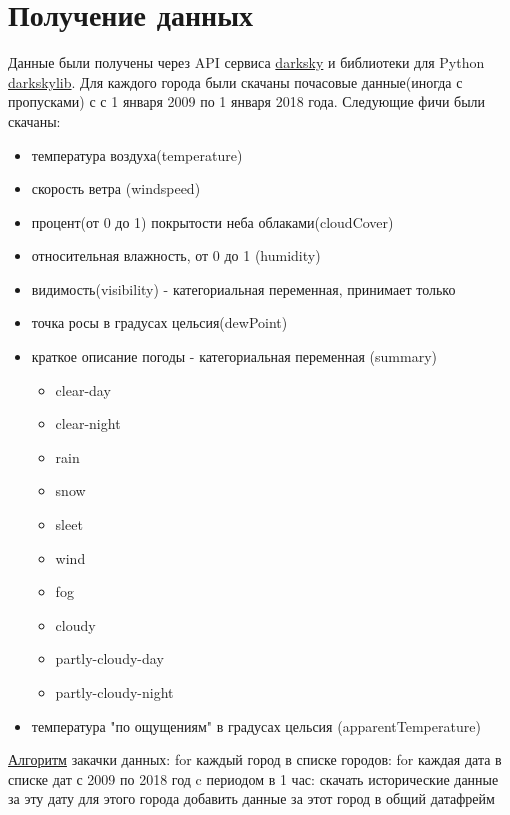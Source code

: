 \documentclass[11pt]{article}
\begin{document}
\section{Получение данных}
\label{sec:org862f09d}
Данные были получены через API сервиса \href{https://darksky.net}{darksky} и библиотеки для Python \href{https://pypi.org/project/darkskylib/}{darkskylib}. Для каждого города были скачаны
почасовые данные(иногда с пропусками) с с 1 января 2009 по 1 января 2018 года. Следующие фичи были скачаны:
\begin{itemize}
\item температура воздуха(temperature)
\item скорость ветра (windspeed)
\item процент(от 0 до 1) покрытости неба облаками(cloudCover)
\item относительная влажность, от 0 до 1 (humidity)
\item видимость(visibility) - категориальная переменная, принимает только
\item точка росы в градусах цельсия(dewPoint)
\item краткое описание погоды - категориальная переменная (summary)
\begin{itemize}
\item clear-day
\item clear-night
\item rain
\item snow
\item sleet
\item wind
\item fog
\item cloudy
\item partly-cloudy-day
\item partly-cloudy-night
\end{itemize}
\item температура "по ощущениям" в градусах цельсия (apparentTemperature)
\end{itemize}

\href{https://github.com/gazon1/diplom/blob/master/main.py}{Алгоритм} закачки данных:
for каждый город в списке городов:
    for каждая дата в списке дат с 2009 по 2018 год c периодом в  1 час:
        скачать исторические данные за эту дату для этого города
    добавить данные за этот город в общий датафрейм
\end{document}
